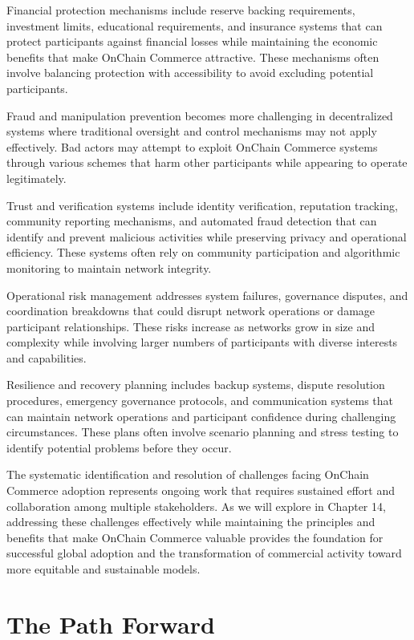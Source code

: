 \documentclass[
  Letterpaper,
]{scrbook}
\begin{document}
Financial protection mechanisms include reserve backing requirements,
investment limits, educational requirements, and insurance systems that
can protect participants against financial losses while maintaining the
economic benefits that make OnChain Commerce attractive. These
mechanisms often involve balancing protection with accessibility to
avoid excluding potential participants.

Fraud and manipulation prevention becomes more challenging in
decentralized systems where traditional oversight and control mechanisms
may not apply effectively. Bad actors may attempt to exploit OnChain
Commerce systems through various schemes that harm other participants
while appearing to operate legitimately.

Trust and verification systems include identity verification, reputation
tracking, community reporting mechanisms, and automated fraud detection
that can identify and prevent malicious activities while preserving
privacy and operational efficiency. These systems often rely on
community participation and algorithmic monitoring to maintain network
integrity.

Operational risk management addresses system failures, governance
disputes, and coordination breakdowns that could disrupt network
operations or damage participant relationships. These risks increase as
networks grow in size and complexity while involving larger numbers of
participants with diverse interests and capabilities.

Resilience and recovery planning includes backup systems, dispute
resolution procedures, emergency governance protocols, and communication
systems that can maintain network operations and participant confidence
during challenging circumstances. These plans often involve scenario
planning and stress testing to identify potential problems before they
occur.

The systematic identification and resolution of challenges facing
OnChain Commerce adoption represents ongoing work that requires
sustained effort and collaboration among multiple stakeholders. As we
will explore in Chapter 14, addressing these challenges effectively
while maintaining the principles and benefits that make OnChain Commerce
valuable provides the foundation for successful global adoption and the
transformation of commercial activity toward more equitable and
sustainable models.

\chapter{The Path Forward}\label{sec-path-forward}
\end{document}
